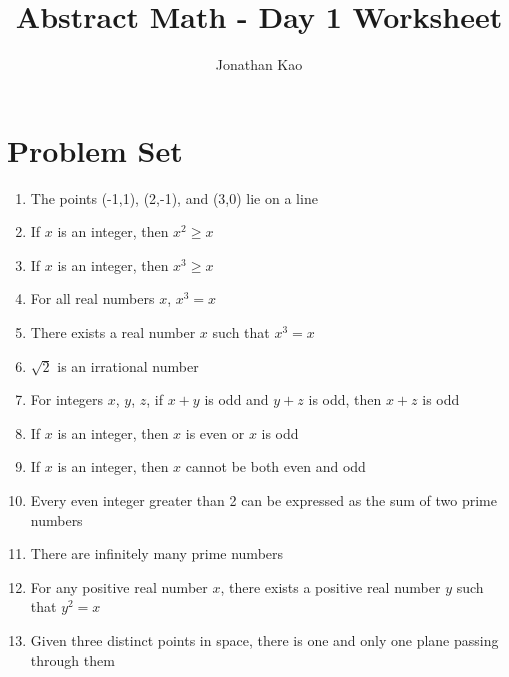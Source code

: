 \documentclass{article}
\begin{document}
\title{Abstract Math - Day 1 Worksheet}                  %
\author{Jonathan Kao}             %
\maketitle                      %


\section*{Problem Set}

\begin{enumerate}

	\item{The points (-1,1), (2,-1), and (3,0) lie on a line}
	\item{If $x$ is an integer, then $x^2\geq x$}
	\item{If $x$ is an integer, then $x^3\geq x$}
	\item{For all real numbers $x$, $x^3=x$}
	\item{There exists a real number $x$ such that $x^3=x$}
	\item{$\sqrt{2}$ is an irrational number}
	\item{For integers $x$, $y$, $z$, if $x+y$ is odd and $y+z$ is odd, then $x+z$ is odd}
	\item{If $x$ is an integer, then $x$ is even or $x$ is odd}
	\item{If $x$ is an integer, then $x$ cannot be both even and odd}
	\item{Every even integer greater than 2 can be expressed as the sum of two prime numbers}
	\item{There are infinitely many prime numbers}
	\item{For any positive real number $x$, there exists a positive real number $y$ such that $y^2=x$}
	\item{Given three distinct points in space, there is one and only one plane passing through them}
	


\end{enumerate}
\end{document}
